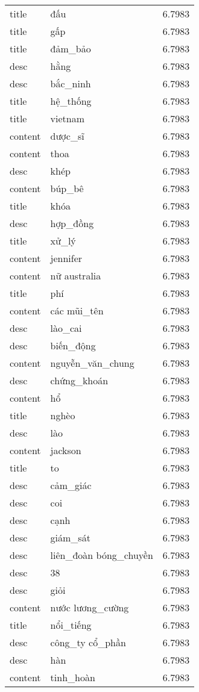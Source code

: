 \documentclass{article}
\begin{document}
\begin{tabular}{lll}
title & đấu & 6.7983\\
title & gấp & 6.7983\\
title & đảm\_bảo & 6.7983\\
desc & hằng & 6.7983\\
desc & bắc\_ninh & 6.7983\\
title & hệ\_thống & 6.7983\\
title & vietnam & 6.7983\\
content & dược\_sĩ & 6.7983\\
content & thoa & 6.7983\\
desc & khép & 6.7983\\
content & búp\_bê & 6.7983\\
title & khóa & 6.7983\\
desc & hợp\_đồng & 6.7983\\
title & xử\_lý & 6.7983\\
content & jennifer & 6.7983\\
content & nữ australia & 6.7983\\
title & phí & 6.7983\\
content & các mũi\_tên & 6.7983\\
desc & lào\_cai & 6.7983\\
desc & biến\_động & 6.7983\\
content & nguyễn\_văn\_chung & 6.7983\\
desc & chứng\_khoán & 6.7983\\
content & hổ & 6.7983\\
title & nghèo & 6.7983\\
desc & lào & 6.7983\\
content & jackson & 6.7983\\
title & to & 6.7983\\
desc & cảm\_giác & 6.7983\\
desc & coi & 6.7983\\
desc & cạnh & 6.7983\\
desc & giám\_sát & 6.7983\\
desc & liên\_đoàn bóng\_chuyền & 6.7983\\
desc & 38 & 6.7983\\
desc & giỏi & 6.7983\\
content & nước lương\_cường & 6.7983\\
title & nổi\_tiếng & 6.7983\\
desc & công\_ty cổ\_phần & 6.7983\\
desc & hàn & 6.7983\\
content & tinh\_hoàn & 6.7983\\

\end{tabular}
\end{document}
